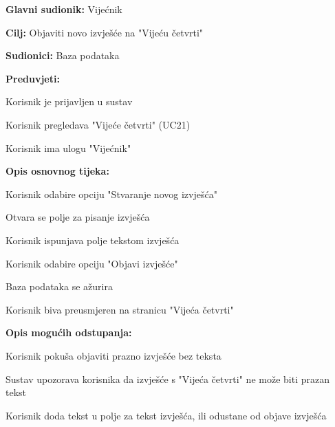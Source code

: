 					\noindent {}
					\begin{packed_item}
	
						\item \textbf{Glavni sudionik: }Vijećnik
						\item  \textbf{Cilj:} Objaviti novo izvješće na "Vijeću četvrti"
						\item  \textbf{Sudionici:} Baza podataka
						\item  \textbf{Preduvjeti:}
						\item[] \begin{packed_enum}
							\item Korisnik je prijavljen u sustav
							\item Korisnik pregledava "Vijeće četvrti" (UC21)
							\item Korisnik ima ulogu "Vijećnik"
						\end{packed_enum}
						\item  \textbf{Opis osnovnog tijeka:}
						
						\item[] \begin{packed_enum}
	
							\item Korisnik odabire opciju "Stvaranje novog izvješća" 
							\item Otvara se polje za pisanje izvješća
							\item Korisnik ispunjava polje tekstom izvješća
							\item Korisnik odabire opciju "Objavi izvješće"
							\item Baza podataka se ažurira
							\item Korisnik biva preusmjeren na stranicu "Vijeća četvrti"
							
							
						\end{packed_enum}
						
						\item  \textbf{Opis mogućih odstupanja:}
						
						\item[] \begin{packed_item}
	
							\item[4.a] Korisnik pokuša objaviti prazno izvješće bez teksta
							\item[] \begin{packed_enum}
								
								\item Sustav upozorava korisnika da izvješće s "Vijeća četvrti" ne može biti prazan tekst
								\item Korisnik doda tekst u polje za tekst izvješća, ili odustane od objave izvješća
							\end{packed_enum}
								

\end{packed_item}
\end{packed_item}
